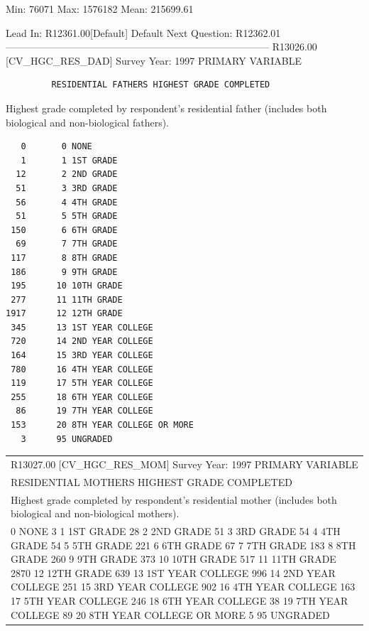 \documentclass[
  man,floatsintext]{apa6}
\begin{document}
Min: 76071 Max: 1576182 Mean: 215699.61

Lead In: R12361.00{[}Default{]}
Default Next Question: R12362.01
--------------------------------------------------------------------------------
R13026.00 {[}CV\_HGC\_RES\_DAD{]} Survey Year: 1997
PRIMARY VARIABLE

\begin{verbatim}
         RESIDENTIAL FATHERS HIGHEST GRADE COMPLETED
\end{verbatim}

Highest grade completed by respondent's residential father (includes both
biological and non-biological fathers).

\begin{verbatim}
   0       0 NONE
   1       1 1ST GRADE
  12       2 2ND GRADE
  51       3 3RD GRADE
  56       4 4TH GRADE
  51       5 5TH GRADE
 150       6 6TH GRADE
  69       7 7TH GRADE
 117       8 8TH GRADE
 186       9 9TH GRADE
 195      10 10TH GRADE
 277      11 11TH GRADE
1917      12 12TH GRADE
 345      13 1ST YEAR COLLEGE
 720      14 2ND YEAR COLLEGE
 164      15 3RD YEAR COLLEGE
 780      16 4TH YEAR COLLEGE
 119      17 5TH YEAR COLLEGE
 255      18 6TH YEAR COLLEGE
  86      19 7TH YEAR COLLEGE
 153      20 8TH YEAR COLLEGE OR MORE
   3      95 UNGRADED
\end{verbatim}

\begin{longtable}[]{@{}
  >{\centering\arraybackslash}p{}@{}}
\toprule\noalign{}
\begin{minipage}[b]{\linewidth}\centering
5707
\end{minipage} \\
\midrule\noalign{}
\endhead
\bottomrule\noalign{}
\endlastfoot
R13027.00 {[}CV\_HGC\_RES\_MOM{]} Survey Year: 1997
PRIMARY VARIABLE \\
RESIDENTIAL MOTHERS HIGHEST GRADE COMPLETED \\
Highest grade completed by respondent's residential mother (includes both
biological and non-biological mothers). \\
0 0 NONE
3 1 1ST GRADE
28 2 2ND GRADE
51 3 3RD GRADE
54 4 4TH GRADE
54 5 5TH GRADE
221 6 6TH GRADE
67 7 7TH GRADE
183 8 8TH GRADE
260 9 9TH GRADE
373 10 10TH GRADE
517 11 11TH GRADE
2870 12 12TH GRADE
639 13 1ST YEAR COLLEGE
996 14 2ND YEAR COLLEGE
251 15 3RD YEAR COLLEGE
902 16 4TH YEAR COLLEGE
163 17 5TH YEAR COLLEGE
246 18 6TH YEAR COLLEGE
38 19 7TH YEAR COLLEGE
89 20 8TH YEAR COLLEGE OR MORE
5 95 UNGRADED \\
\end{longtable}
\end{document}
